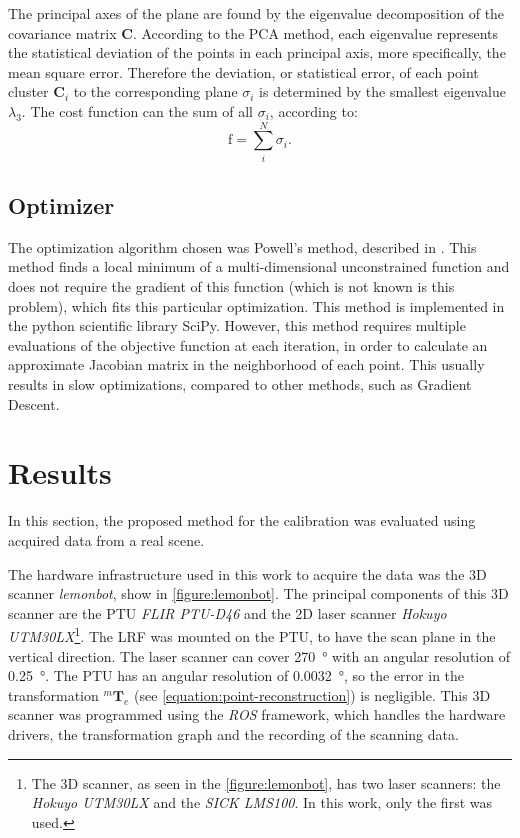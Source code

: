 \documentclass[conference]{IEEEtran}
\begin{document}
The principal axes of the plane are found by the eigenvalue decomposition of the covariance matrix $\bm{C}$. According to the PCA method, each eigenvalue represents the statistical deviation of the points in each principal axis, more specifically, the mean square error. Therefore the deviation, or statistical error, of each point cluster $\bm{C}_i$ to the corresponding plane $\sigma_i$ is determined by the smallest eigenvalue $\lambda_3$. The cost function can the sum of all $\sigma_i$, according to:
%
\begin{equation}
    \textrm{f} = \sum_{i}^{N}{\sigma_i}.
\end{equation}

\subsection{Optimizer}

The optimization algorithm chosen was Powell's method, described in \cite{powell64}. This method finds a local minimum of a multi-dimensional unconstrained function and does not require the gradient of this function (which is not known is this problem), which fits this particular optimization. This method is implemented in the python scientific library SciPy. However, this method requires multiple evaluations of the objective function at each iteration, in order to calculate an approximate Jacobian matrix in the neighborhood of each point. This usually results in slow optimizations, compared to other methods, such as Gradient Descent.

\section{Results}
\label{section:results}

In this section, the proposed method for the calibration was evaluated using acquired data from a real scene. 

The hardware infrastructure used in this work to acquire the data was the 3D scanner \textit{lemonbot}, show in \cref{figure:lemonbot}. The principal components of this 3D scanner are the PTU \textit{FLIR PTU-D46} and the 2D laser scanner \textit{Hokuyo UTM30LX}\footnote{The 3D scanner, as seen in the \cref{figure:lemonbot}, has two laser scanners: the \textit{Hokuyo UTM30LX} and the \textit{SICK LMS100}. In this work, only the first was used.}. The LRF was mounted on the PTU, to have the scan plane in the vertical direction. The laser scanner can cover \SI{270}{\degree} with an angular resolution of \SI{0.25}{\degree}. The PTU has an angular resolution of \SI{0.0032}{\degree}, so the error in the transformation $^{m}\mathbf{T}_{e}$ (see \cref{equation:point-reconstruction}) is negligible. This 3D scanner was programmed using the \textit{ROS} framework, which handles the hardware drivers, the transformation graph and the recording of the scanning data.
\end{document}
